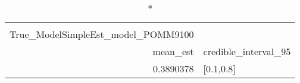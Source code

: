 \begin{longtable}{rl}
\caption*{
{\large alphasummarytable} \\ 
{\small True\_ModelSimpleEst\_model\_POMM9100}
} \\ 
\toprule
mean\_est & credible\_interval\_95 \\ 
\midrule
0.3890378 & [0.1,0.8] \\ 
\bottomrule
\end{longtable}

